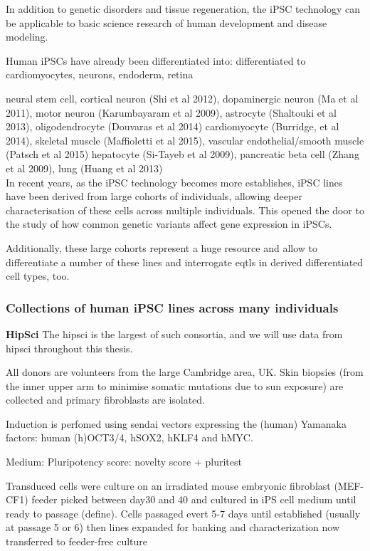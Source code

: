In addition to genetic disorders and tissue regeneration, the iPSC technology can be applicable to basic science research of human development and disease modeling.

Human iPSCs have already been differentiated into: 
differentiated to cardiomyocytes, neurons, endoderm, retina

neural stem cell, cortical neuron (Shi et al 2012), dopaminergic neuron (Ma et al 2011), motor neuron (Karumbayaram et al 2009), astrocyte (Shaltouki et al 2013), oligodendrocyte (Douvaras et al 2014)
cardiomyocyte (Burridge, et al 2014), skeletal muscle (Maffioletti et al 2015), vascular endothelial/smooth muscle (Patsch et al 2015)
hepatocyte (Si-Tayeb et al 2009), pancreatic beta cell (Zhang et al 2009), lung (Huang et al 2013)\\


In recent years, as the iPSC technology becomes more establishes, iPSC lines have been derived from large cohorts of individuals, allowing deeper characterisation of these cells across multiple individuals.
This opened the door to the study of how common genetic variants affect gene expression in iPSCs.


Additionally, these large cohorts represent a huge resource and allow to differentiate a number of these lines and interrogate \glspl{eqtl} in derived differentiated cell types, too.

\subsubsection{Collections of human iPSC lines across many individuals}

\textbf{HipSci}
The \gls{hipsci} is the largest of such consortia, and we will use data from \gls{hipsci} \cite{kilpinen2017common} throughout this thesis.


All donors are volunteers from the large Cambridge area, UK.
Skin biopsies (from the inner upper arm to minimise somatic mutations due to sun exposure) are collected and primary fibroblasts are isolated.

Induction is perfomed using sendai vectors expressing the (human) Yamanaka factors: human (h)OCT3/4, hSOX2, hKLF4 and hMYC.

Medium:
Pluripotency score: novelty score + pluritest \cite{muller2011bioinformatic}


Transduced cells were culture on an irradiated mouse embryonic fibroblast (MEF-CF1) feeder
picked between day30 and 40 and cultured in iPS cell medium until ready to passage (define). 
Cells passaged evert 5-7 days until established (usually at passage 5 or 6)
then lines expanded for banking and characterization
now transferred to feeder-free culture

